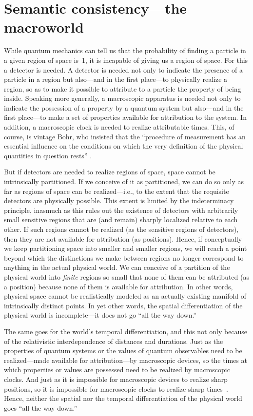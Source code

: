 \section{Semantic consistency---the macroworld}\label{sec:semantic}
While quantum mechanics can tell us that the probability of finding a particle in a given region of space is~1, it is incapable of  giving us a region of space. For this a detector is needed. A detector is needed not only to indicate the presence of a particle in a region but also---and in the first place---to physically realize a region, so as to make it possible to attribute to a particle the property of being inside. Speaking more generally, a macroscopic apparatus is needed not only to indicate the possession of a property by a quantum system but also---and in the first place---to make a set of properties available for attribution to the system. In addition, a macroscopic clock is needed to realize attributable times. This, of course, is vintage Bohr, who insisted that the ``procedure of measurement has an essential influence on the conditions on which the very definition of the physical quantities in question rests'' \citep{Bohr1935}. 

But if detectors are needed to realize regions of space, space cannot be intrinsically partitioned. If we conceive of it as partitioned, we can do so only as far as regions of space can be realized---i.e., to the extent that the requisite detectors are physically possible. This extent is limited by the indeterminacy principle, inasmuch as this rules out the existence of detectors with arbitrarily small sensitive regions that are (and remain) sharply localized relative to each other. If such regions cannot be realized (as the sensitive regions of detectors), then they are not available for attribution (as positions). Hence, if conceptually we keep partitioning space into smaller and smaller regions, we will reach a point beyond which the distinctions we make between regions no longer correspond to anything in the actual physical world. We can conceive of a partition of the physical world into \emph{finite} regions so small that none of them can be attributed (as a position) because none of them is available for attribution. In other words, physical space cannot be realistically modeled as an actually existing manifold of intrinsically distinct points. In yet other words, the spatial differentiation of the physical world is incomplete---it does not go ``all the way down.'' 

The same goes for the world's temporal differentiation, and this not only because of the relativistic interdependence of distances and durations. Just as the properties of quantum systems or the values of quantum observables need to be realized---made available for attribution---by macroscopic devices, so the times at which properties or values are possessed need to be realized by macroscopic clocks. And just as it is impossible for macroscopic devices to realize sharp positions, so it is impossible for macroscopic clocks to realize sharp times~\citep{Hilgevoord98}. Hence, neither the spatial nor the temporal differentiation of the physical world goes ``all the way down.''

